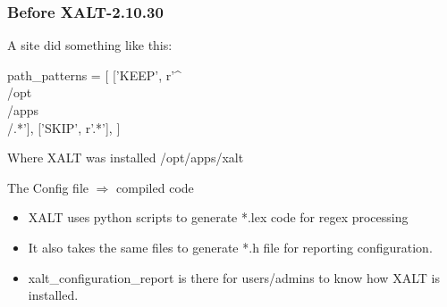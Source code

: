 \documentclass{beamer}
\begin{document}
\begin{frame}[fragile]
    \frametitle{Before XALT-2.10.30}
A site did something like this:
 {\small
    \begin{semiverbatim}
path_patterns = [
    ['KEEP',  r'^\\/opt\\/apps\\/.*'],
    ['SKIP',  r'.*'],
  ]
    \end{semiverbatim}
}
Where XALT was installed /opt/apps/xalt
\end{frame}

\begin{frame}{The Config file $\Rightarrow$ compiled code}
  \begin{itemize}
    \item XALT uses python scripts to generate *.lex code for regex processing
    \item It also takes the same files to generate *.h file for
      reporting configuration.
    \item xalt_configuration_report is there for users/admins to know
      how XALT is installed.
  \end{itemize}
\end{frame}
\end{document}
